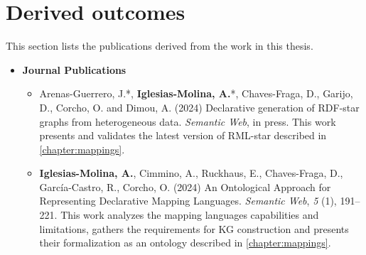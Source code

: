 \section{Derived outcomes}

This section lists the publications derived from the work in this thesis.


\begin{itemize}
    \item \textbf{Journal Publications}
    \begin{itemize}
        \item Arenas-Guerrero, J.*, \textbf{Iglesias-Molina, A.}*, Chaves-Fraga, D., Garijo, D., Corcho, O. and Dimou, A. (2024) Declarative generation of RDF-star graphs from heterogeneous data. \textit{Semantic Web}, in press. This work presents and validates the latest version of RML-star described in \cref{chapter:mappings}.
        
        \item \textbf{Iglesias-Molina, A.}, Cimmino, A., Ruckhaus, E., Chaves-Fraga, D., García-Castro, R., Corcho, O. (2024) An Ontological Approach for Representing Declarative Mapping Languages. \textit{Semantic Web}, \textit{5} (1), 191–221. This work analyzes the mapping languages capabilities and limitations, gathers the requirements for KG construction and presents their formalization as an ontology described in \cref{chapter:mappings}.
    \end{itemize}
\end{itemize}




